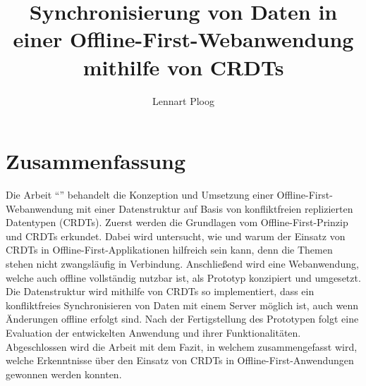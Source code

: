 \documentclass[a4paper, 12pt]{scrreprt}
\title{Synchronisierung von Daten in einer Offline-First-Webanwendung mithilfe von CRDTs}
\subtitle{}
\author{Lennart Ploog}
\makeatletter
\let\inserttitle\@title
\makeatother
\begin{document}
\newpage
\section*{Zusammenfassung}
Die Arbeit \enquote{\inserttitle} behandelt die Konzeption und Umsetzung einer Offline-First-Webanwendung mit einer Datenstruktur auf Basis von konfliktfreien replizierten Datentypen (CRDTs). Zuerst werden die Grundlagen vom Offline-First-Prinzip und CRDTs erkundet. Dabei wird untersucht, wie und warum der Einsatz von CRDTs in Offline-First-Applikationen hilfreich sein kann, denn die Themen stehen nicht zwangsläufig in Verbindung. Anschließend wird eine Webanwendung, welche auch offline vollständig nutzbar ist, als Prototyp konzipiert und umgesetzt. Die Datenstruktur wird mithilfe von CRDTs so implementiert, dass ein konfliktfreies Synchronisieren von Daten mit einem Server möglich ist, auch wenn Änderungen offline erfolgt sind. Nach der Fertigstellung des Prototypen folgt eine Evaluation der entwickelten Anwendung und ihrer Funktionalitäten. Abgeschlossen wird die Arbeit mit dem Fazit, in welchem zusammengefasst wird, welche Erkenntnisse über den Einsatz von CRDTs in Offline-First-Anwendungen gewonnen werden konnten.
\end{document}
